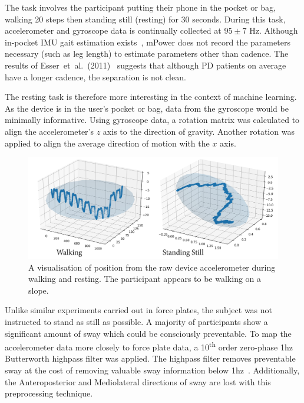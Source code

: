\documentclass[12pt, twoside]{book}
\renewcommand\emph[1]{\textit{\color{USred}{#1}}}
\begin{document}
The \emph{walking} task involves the participant putting their phone in the pocket or bag, walking 20 steps then standing still (resting) for 30 seconds. During this task, accelerometer and gyroscope data is continually collected at $95\pm7$ Hz. Although in-pocket IMU gait estimation exists~\cite{diaz2014step}, mPower does not record the parameters necessary (such as leg length) to estimate parameters other than cadence. The results of Esser~et~al.~(2011)~\cite{esser2011assessment} suggests that although PD patients on average have a longer cadence, the separation is not clean.

The resting task is therefore more interesting in the context of machine learning. As the device is in the user's pocket or bag, data from the gyroscope would be minimally informative. Using gyroscope data, a rotation matrix was calculated to align the accelerometer's $z$ axis to the direction of gravity. Another rotation was applied to align the average direction of motion with the $x$ axis.

\begin{figure}[h]
\label{mpowerwalking}
\centering\includegraphics[width=0.9\linewidth]{pathvis3d.png}
\caption{A visualisation of position from the raw device accelerometer during walking and resting. The participant appears to be walking on a slope.}
\end{figure}

Unlike similar experiments carried out in force plates, the subject was not instructed to stand as still as possible. A majority of participants show a significant amount of sway which could be consciously preventable. To map the accelerometer data more closely to force plate data, a 10\textsuperscript{th} order zero-phase 1hz Butterworth highpass filter was applied. The highpass filter removes preventable sway at the cost of removing valuable sway information below 1hz~\cite{swayspectral}. Additionally, the Anteroposterior and Mediolateral directions of sway are lost with this preprocessing technique.
\end{document}
